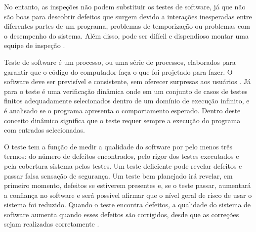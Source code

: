 No entanto, as inspeções não podem substituir os testes de software, já que não são boas para descobrir defeitos que surgem devido a interações inesperadas entre diferentes partes de um programa, problemas de temporização ou problemas com o desempenho do sistema. Além disso, pode ser difícil e dispendioso montar uma equipe de inspeção \cite{sommerville2010}. 
% 
% 
% 
% 
% 
% 



Teste de software é um processo, ou uma série de processos, elaborados para garantir que o código do computador faça o que foi projetado para fazer. O software deve ser previsível e consistente, sem oferecer surpresas aos usuários \cite{myers2011art}. Já para \cite{bourque2014guide} o teste é uma verificação dinâmica onde em um conjunto de casos de testes finitos adequadamente selecionados dentro de um domínio de execução infinito, e é analisado se o programa apresenta o comportamento esperado. Dentro deste conceito dinâmico significa que o teste requer sempre a execução do programa com entradas selecionadas.

O teste tem a função de medir a qualidade do software por pelo menos três termos: do número de defeitos encontrados, pelo rigor dos testes executados e pela cobertura sistema pelos testes. Um teste deficiente pode revelar defeitos e passar falsa sensação de segurança. Um teste bem planejado irá revelar, em primeiro momento, defeitos se estiverem presentes e, se o teste passar, aumentará a confiança no software e será possível afirmar que o nível geral de risco de usar o sistema foi reduzido. Quando o teste encontra defeitos, a qualidade do sistema de software aumenta quando esses defeitos são corrigidos, desde que as correções sejam realizadas corretamente \cite{graham2008foundations}.
% 
% 

